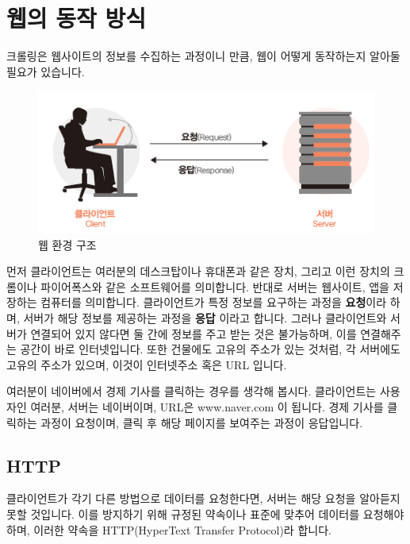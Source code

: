 \documentclass[]{book}
\begin{document}
\hypertarget{section-6}{%
\section{웹의 동작 방식}\label{section-6}}

크롤링은 웹사이트의 정보를 수집하는 과정이니 만큼, 웹이 어떻게 동작하는지 알아둘 필요가 있습니다.

\begin{figure}

{\centering \includegraphics{images/web_str} 

}

\caption{웹 환경 구조}\label{fig:unnamed-chunk-5}
\end{figure}

먼저 클라이언트는 여러분의 데스크탑이나 휴대폰과 같은 장치, 그리고 이런 장치의 크롬이나 파이어폭스와 같은 소프트웨어를 의미합니다. 반대로 서버는 웹사이트, 앱을 저장하는 컴퓨터를 의미합니다. 클라이언트가 특정 정보를 요구하는 과정을 \textbf{요청}이라 하며, 서버가 해당 정보를 제공하는 과정을 \textbf{응답} 이라고 합니다. 그러나 클라이언트와 서버가 연결되어 있지 않다면 둘 간에 정보를 주고 받는 것은 불가능하며, 이를 연결해주는 공간이 바로 인터넷입니다. 또한 건물에도 고유의 주소가 있는 것처럼, 각 서버에도 고유의 주소가 있으며, 이것이 인터넷주소 혹은 URL 입니다.

여러분이 네이버에서 경제 기사를 클릭하는 경우를 생각해 봅시다. 클라이언트는 사용자인 여러분, 서버는 네이버이며, URL은 www.naver.com 이 됩니다. 경제 기사를 클릭하는 과정이 요청이며, 클릭 후 해당 페이지를 보여주는 과정이 응답입니다.

\hypertarget{http}{%
\subsection{HTTP}\label{http}}

클라이언트가 각기 다른 방법으로 데이터를 요청한다면, 서버는 해당 요청을 알아듣지 못할 것입니다. 이를 방지하기 위해 규정된 약속이나 표준에 맞추어 데이터를 요청해야하며, 이러한 약속을 HTTP(HyperText Transfer Protocol)라 합니다.
\end{document}
